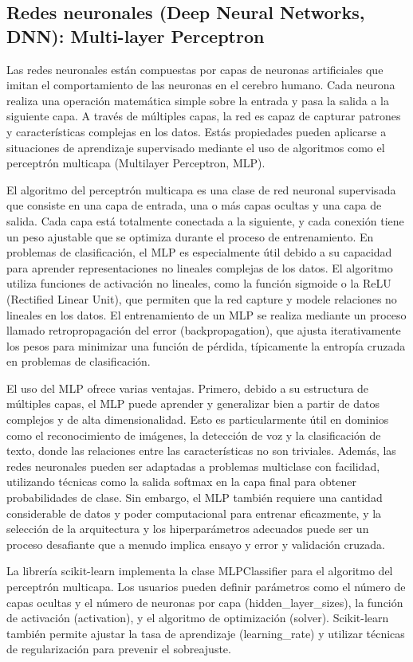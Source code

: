\subsection{Redes neuronales (Deep Neural Networks, DNN): Multi-layer Perceptron}
\label{subsec:model-neural}

Las redes neuronales están compuestas por capas de neuronas artificiales que imitan el comportamiento de las neuronas en el cerebro humano. Cada neurona realiza una operación matemática simple sobre la entrada y pasa la salida a la siguiente capa. A través de múltiples capas, la red es capaz de capturar patrones y características complejas en los datos. Estás propiedades pueden aplicarse a situaciones de aprendizaje supervisado mediante el uso de algoritmos como el perceptrón multicapa (Multilayer Perceptron, MLP).

El algoritmo del perceptrón multicapa es una clase de red neuronal supervisada que consiste en una capa de entrada, una o más capas ocultas y una capa de salida. Cada capa está totalmente conectada a la siguiente, y cada conexión tiene un peso ajustable que se optimiza durante el proceso de entrenamiento. En problemas de clasificación, el MLP es especialmente útil debido a su capacidad para aprender representaciones no lineales complejas de los datos. El algoritmo utiliza funciones de activación no lineales, como la función sigmoide o la ReLU (Rectified Linear Unit), que permiten que la red capture y modele relaciones no lineales en los datos. El entrenamiento de un MLP se realiza mediante un proceso llamado retropropagación del error (backpropagation), que ajusta iterativamente los pesos para minimizar una función de pérdida, típicamente la entropía cruzada en problemas de clasificación.

El uso del MLP ofrece varias ventajas. Primero, debido a su estructura de múltiples capas, el MLP puede aprender y generalizar bien a partir de datos complejos y de alta dimensionalidad. Esto es particularmente útil en dominios como el reconocimiento de imágenes, la detección de voz y la clasificación de texto, donde las relaciones entre las características no son triviales. Además, las redes neuronales pueden ser adaptadas a problemas multiclase con facilidad, utilizando técnicas como la salida softmax en la capa final para obtener probabilidades de clase. Sin embargo, el MLP también requiere una cantidad considerable de datos y poder computacional para entrenar eficazmente, y la selección de la arquitectura y los hiperparámetros adecuados puede ser un proceso desafiante que a menudo implica ensayo y error y validación cruzada.

La librería scikit-learn implementa la clase MLPClassifier \cite{sk-multilayer-perceptron} para el algoritmo del perceptrón multicapa. Los usuarios pueden definir parámetros como el número de capas ocultas y el número de neuronas por capa (hidden\_layer\_sizes), la función de activación (activation), y el algoritmo de optimización (solver). Scikit-learn también permite ajustar la tasa de aprendizaje (learning\_rate) y utilizar técnicas de regularización para prevenir el sobreajuste.